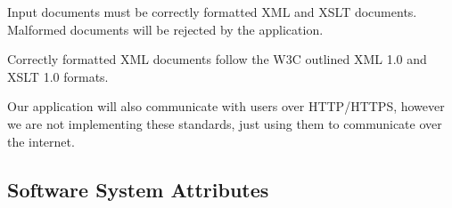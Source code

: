Input documents must be correctly formatted XML and XSLT documents.
Malformed documents will be rejected by the application.

Correctly formatted XML documents follow the W3C outlined XML 1.0 and XSLT 1.0 formats. \cite{xml-spec} \cite{xslt-spec}

Our application will also communicate with users over HTTP/HTTPS, however we are not implementing these standards, just using them to communicate over the internet.


\subsection{Software System Attributes}


